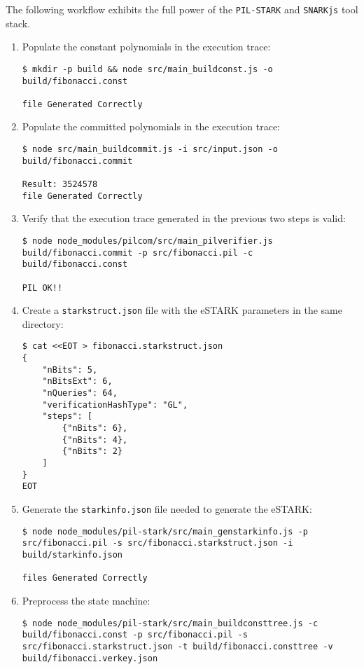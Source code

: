 The following workflow exhibits the full power of the \texttt{PIL-STARK} and \texttt{SNARKjs} tool stack. 
\begin{enumerate}
\item Populate the constant polynomials in the execution trace:
\begin{lstlisting}[style=termt]
$ mkdir -p build && node src/main_buildconst.js -o build/fibonacci.const

file Generated Correctly
\end{lstlisting}

\item Populate the committed polynomials in the execution trace:
\begin{lstlisting}[style=termt]
$ node src/main_buildcommit.js -i src/input.json -o build/fibonacci.commit

Result: 3524578
file Generated Correctly
\end{lstlisting}

\item Verify that the execution trace generated in the previous two steps is valid:
\begin{lstlisting}[style=termt]
$ node node_modules/pilcom/src/main_pilverifier.js build/fibonacci.commit -p src/fibonacci.pil -c build/fibonacci.const

PIL OK!!
\end{lstlisting}

\item Create a \texttt{starkstruct.json} file with the eSTARK parameters in the same directory:
\begin{lstlisting}[style=termt]
$ cat <<EOT > fibonacci.starkstruct.json
{
    "nBits": 5,
    "nBitsExt": 6,
    "nQueries": 64,
    "verificationHashType": "GL",
    "steps": [
        {"nBits": 6},
        {"nBits": 4},
        {"nBits": 2}
    ]
}
EOT
\end{lstlisting}

\item Generate the \texttt{starkinfo.json} file needed to generate the eSTARK:
\begin{lstlisting}[style=termt]
$ node node_modules/pil-stark/src/main_genstarkinfo.js -p src/fibonacci.pil -s src/fibonacci.starkstruct.json -i build/starkinfo.json

files Generated Correctly
\end{lstlisting}

\item Preprocess the state machine:
\begin{lstlisting}[style=termt]
$ node node_modules/pil-stark/src/main_buildconsttree.js -c build/fibonacci.const -p src/fibonacci.pil -s src/fibonacci.starkstruct.json -t build/fibonacci.consttree -v build/fibonacci.verkey.json


\end{lstlisting}
\end{enumerate}
